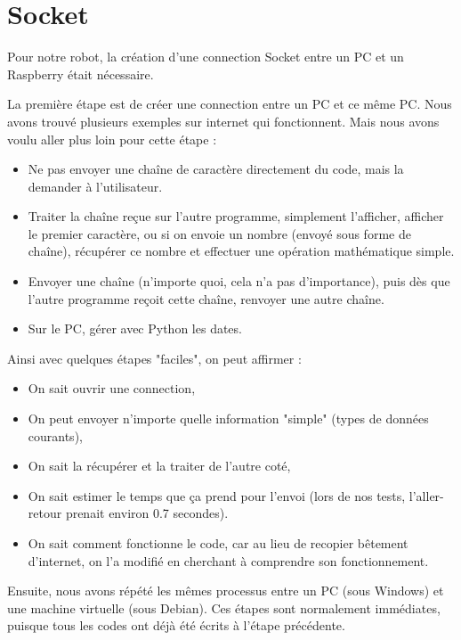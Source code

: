 \documentclass[12pt,a4paper]{report}
\begin{document}
\section{Socket}

Pour notre robot, la création d'une connection Socket entre un PC et un Raspberry était nécessaire.

La première étape est de créer une connection entre un PC et ce même PC. Nous avons trouvé plusieurs exemples sur internet qui fonctionnent. Mais nous avons voulu aller plus loin pour cette étape : 

\bigbreak

\begin{itemize}
\item Ne pas envoyer une chaîne de caractère directement du code, mais la demander à l'utilisateur.
\item Traiter la chaîne reçue sur l'autre programme, simplement l'afficher, afficher le premier caractère, ou si on envoie un nombre (envoyé sous forme de chaîne), récupérer ce nombre et effectuer une opération mathématique simple.
\item Envoyer une chaîne (n'importe quoi, cela n'a pas d'importance), puis dès que l'autre programme reçoit cette chaîne, renvoyer une autre chaîne.
\item Sur le PC, gérer avec Python les dates.
\end{itemize}

\bigbreak

Ainsi avec quelques étapes "faciles", on peut affirmer :

\bigbreak

\begin{itemize}
\item On sait ouvrir une connection,
\item On peut envoyer n'importe quelle information "simple" (types de données courants),
\item On sait la récupérer et la traiter de l'autre coté,
\item On sait estimer le temps que ça prend pour l'envoi (lors de nos tests, l'aller-retour prenait environ 0.7 secondes).
\item On sait comment fonctionne le code, car au lieu de recopier bêtement d'internet, on l'a modifié en cherchant à comprendre son fonctionnement.
\end{itemize}

\bigbreak

Ensuite, nous avons répété les mêmes processus entre un PC (sous Windows) et une machine virtuelle (sous Debian). Ces étapes sont normalement immédiates, puisque tous les codes ont déjà été écrits à l'étape précédente.
\end{document}
